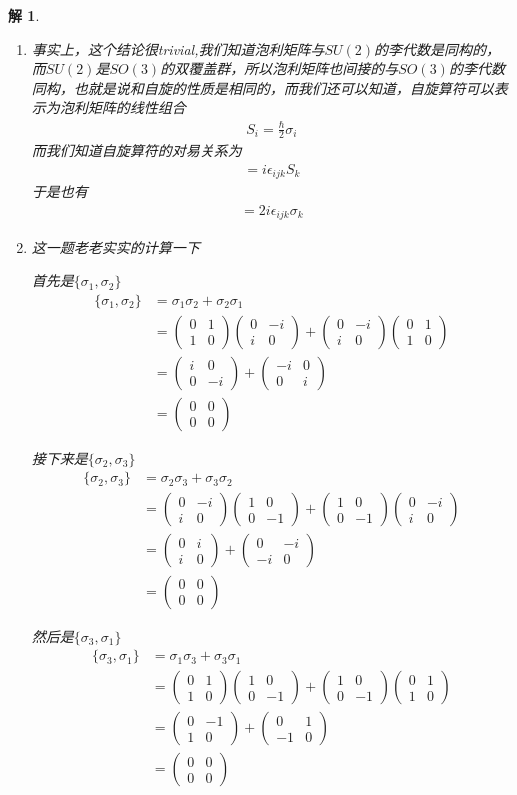 \documentclass{article}
\newtheorem{solution}{解}
\newcommand{\pmtwo}[4]{
    \begin{pmatrix}
        #1&#2\\
        #3&#4
    \end{pmatrix}
    }
\begin{document}
\begin{solution}
    \ \\
    \begin{enumerate}
        \item[(1)] 事实上，这个结论很trivial,我们知道泡利矩阵与$SU(2)$的李代数是同构的，而$SU(2)$是$SO(3)$的双覆盖群，所以泡利矩阵也间接的与$SO(3)$的李代数同构，也就是说和自旋的性质是相同的，而我们还可以知道，自旋算符可以表示为泡利矩阵的线性组合
        \begin{align*}
            S_i=\frac{\hbar}{2}\sigma_i
        \end{align*}
        而我们知道自旋算符的对易关系为
        \begin{align*}
            [S_i,S_j]=i\epsilon_{ijk}S_k
        \end{align*}
        于是也有
        \begin{align*}
            [\sigma_i,\sigma_j]=2i\epsilon_{ijk}\sigma_k
        \end{align*}
        \item[(2)] 这一题老老实实的计算一下
        
        首先是$\{\sigma_1,\sigma_2\}$
        \begin{align*}
            \{\sigma_1,\sigma_2\}&=\sigma_1\sigma_2+\sigma_2\sigma_1\\
            &=\pmtwo{0}{1}{1}{0}\pmtwo{0}{-i}{i}{0}+\pmtwo{0}{-i}{i}{0}\pmtwo{0}{1}{1}{0}\\
            &=\pmtwo{i}{0}{0}{-i}+\pmtwo{-i}{0}{0}{i}\\
            &=\pmtwo{0}{0}{0}{0}
        \end{align*}

        接下来是$\{\sigma_2,\sigma_3\}$
        \begin{align*}
            \{\sigma_2,\sigma_3\}&=\sigma_2\sigma_3+\sigma_3\sigma_2\\
            &=\pmtwo{0}{-i}{i}{0}\pmtwo{1}{0}{0}{-1}+\pmtwo{1}{0}{0}{-1}\pmtwo{0}{-i}{i}{0}\\
            &=\pmtwo{0}{i}{i}{0}+\pmtwo{0}{-i}{-i}{0}\\
            &=\pmtwo{0}{0}{0}{0}
        \end{align*}

        然后是$\{\sigma_3,\sigma_1\}$
        \begin{align*}
            \{\sigma_3,\sigma_1\}&=\sigma_1\sigma_3+\sigma_3\sigma_1\\
            &=\pmtwo{0}{1}{1}{0}\pmtwo{1}{0}{0}{-1}+\pmtwo{1}{0}{0}{-1}\pmtwo{0}{1}{1}{0}\\
            &=\pmtwo{0}{-1}{1}{0}+\pmtwo{0}{1}{-1}{0}\\
            &=\pmtwo{0}{0}{0}{0}
        \end{align*}
        

\end{enumerate}
\end{solution}
\end{document}
